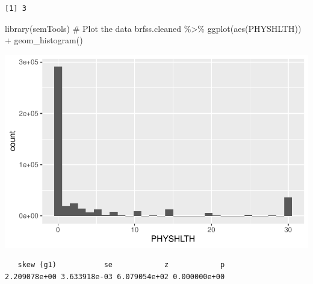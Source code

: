 \documentclass[
  letterpaper,
  DIV=11,
  numbers=noendperiod]{scrreprt}
\newenvironment{Shaded}{\begin{snugshade}}{\end{snugshade}}
\newcommand{\CommentTok}[1]{\textcolor[rgb]{0.37,0.37,0.37}{#1}}
\newcommand{\FunctionTok}[1]{\textcolor[rgb]{0.28,0.35,0.67}{#1}}
\newcommand{\NormalTok}[1]{\textcolor[rgb]{0.00,0.23,0.31}{#1}}
\newcommand{\SpecialCharTok}[1]{\textcolor[rgb]{0.37,0.37,0.37}{#1}}
\begin{document}
\begin{verbatim}
[1] 3
\end{verbatim}

\begin{Shaded}
\begin{Highlighting}[]
\FunctionTok{library}\NormalTok{(semTools)}
\CommentTok{\# Plot the data}
\NormalTok{brfss.cleaned }\SpecialCharTok{\%\textgreater{}\%}
    \FunctionTok{ggplot}\NormalTok{(}\FunctionTok{aes}\NormalTok{(PHYSHLTH)) }\SpecialCharTok{+} \FunctionTok{geom\_histogram}\NormalTok{()}
\end{Highlighting}
\end{Shaded}

\includegraphics{dataprep_files/figure-pdf/unnamed-chunk-54-1.pdf}

\begin{Shaded}
\end{Shaded}

\begin{verbatim}
   skew (g1)           se            z            p 
2.209078e+00 3.633918e-03 6.079054e+02 0.000000e+00 
\end{verbatim}

\begin{Shaded}
\end{Shaded}
\end{document}
